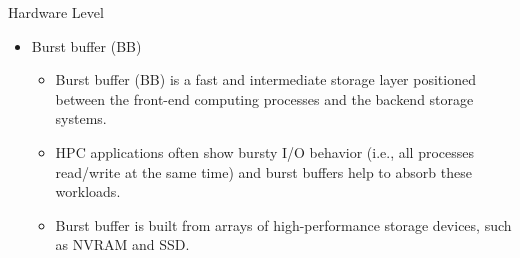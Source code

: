\documentclass[compress,11pt,xcolor=svgnames,aspectratio=169]{beamer}
\begin{document}
\begin{frame}[fragile]{Hardware Level}

\begin{itemize}

    \item Burst buffer (BB)\\[0.4cm]

      \begin{itemize}
      \setlength\itemsep{0.5cm}

      \item Burst buffer (BB) is a fast and intermediate storage layer positioned between the front-end computing processes and the backend storage systems.

      \item HPC applications often show bursty I/O behavior (i.e., all processes read/write at the same time) and burst buffers help to absorb these workloads.

      \item Burst buffer is built from arrays of high-performance storage devices, such as NVRAM and SSD.

      \end{itemize}

\end{itemize}
\end{frame}
\end{document}
